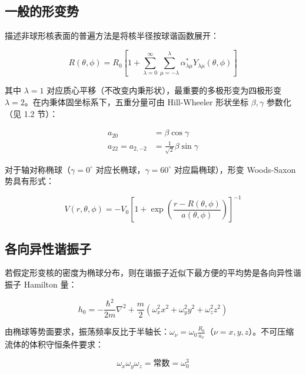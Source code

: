 \subsection{一般的形变势}

描述非球形核表面的普遍方法是将核半径按球谐函数展开：

\begin{equation}
R(\theta,\phi)=R_{0}\left[1+\sum^{\infty}_{\lambda=0}\sum^{\lambda}_{\mu=-\lambda}\alpha^{*}_{\lambda\mu}Y_{\lambda\mu}(\theta,\phi)\right]\label{eq:deformed_surface_expansion}
\end{equation}

其中 $\lambda=1$ 对应质心平移（不改变内秉形状），最重要的多极形变为四极形变 $\lambda=2$。在内秉体固坐标系下，五重分量可由
Hill-Wheeler 形状坐标 $\beta,\gamma$ 参数化（见 1.2 节）：

\begin{align}
a_{20} & =\beta\cos\gamma\nonumber \\
a_{22}=a_{2,-2} & =\frac{1}{\sqrt{2}}\beta\sin\gamma\label{eq:hill_wheeler_beta_gamma}
\end{align}

对于轴对称椭球（$\gamma=0^{\circ}$ 对应长椭球，$\gamma=60^{\circ}$ 对应扁椭球），形变 Woods-Saxon
势具有形式：

\begin{equation}
V(r,\theta,\phi)=-V_{0}\left[1+\exp\left(\frac{r-R(\theta,\phi)}{a(\theta,\phi)}\right)\right]^{-1}\label{eq:deformed_WS_pot}
\end{equation}


\subsection{各向异性谐振子}

若假定形变核的密度为椭球分布，则在谐振子近似下最方便的平均势是各向异性谐振子 Hamilton 量：

\begin{equation}
h_{0}=-\frac{\hbar^{2}}{2m}\nabla^{2}+\frac{m}{2}\left(\omega^{2}_{x}x^{2}+\omega^{2}_{y}y^{2}+\omega^{2}_{z}z^{2}\right)\label{eq:aniso_ho_h0}
\end{equation}

由椭球等势面要求，振荡频率反比于半轴长：$\omega_{\nu}=\omega_{0}\frac{R_{0}}{a_{\nu}}$（$\nu=x,y,z$）。不可压缩流体的体积守恒条件要求：

\begin{equation}
\omega_{x}\omega_{y}\omega_{z}=\text{常数}=\omega^{3}_{0}\label{eq:aniso_ho_vol_conserv}
\end{equation}

